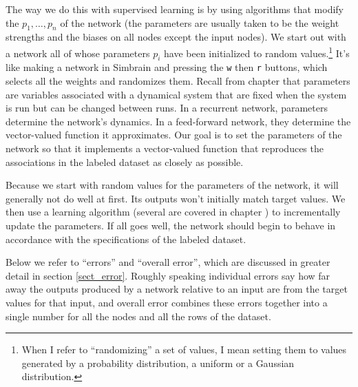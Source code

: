 The way we do this with supervised learning is by using algorithms that modify the   $p_1,\dots,p_n$ of the network (the parameters are usually taken to be the weight strengths and the biases on all nodes except the input nodes). We start out with a network all of whose parameters $p_i$ have been initialized to random values.\footnote{When I refer to ``randomizing'' a set of values, I mean setting them to values generated by a probability distribution, \eg a uniform or a Gaussian distribution.}  It's like making a network in Simbrain and pressing the \texttt{w} then \texttt{r} buttons, which selects all the weights and randomizes them. Recall from chapter  that parameters are variables associated with a dynamical system that are fixed when the system is run but can be changed between runs. In a recurrent network, parameters determine the network's dynamics. In a feed-forward network, they determine the vector-valued function it approximates. Our goal is to set the parameters of the network so that it implements a vector-valued function that reproduces the associations in the labeled dataset as closely as possible.

Because we start with random values for the parameters of the network, it will generally not do well at first. Its outputs won't  initially match target values. We then use a learning algorithm (several are covered in chapter ) to incrementally update the parameters. If all goes well, the network should begin to behave in accordance with the specifications of the labeled dataset.

Below we refer to ``errors''  and ``overall error'', which are discussed in greater detail in section \ref{sect_error}. Roughly speaking individual errors say how far away the outputs produced by a network relative to an input are from the target values for that input, and overall error combines these errors together into a single number for all the nodes and all the rows of the dataset.

